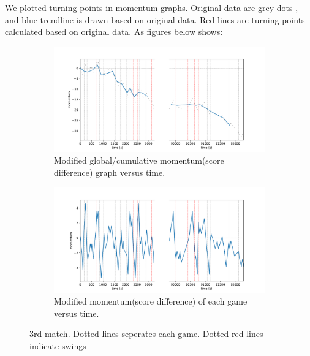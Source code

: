 \documentclass[UTF8]{mcmthesis}
\begin{document}
		We plotted turning points in momentum graphs. Original data are \color{gray} grey dots \color{black}, and \color{blue}blue trendline \color{black}is drawn based on original data. \color{red} Red lines \color{black} are turning points calculated based on original data. As figures below shows:
	
	\begin{figure}[H]
		\centering
		
		\begin{subfigure}[b]{\textwidth}
			\includegraphics[width=1\linewidth]{figs/fig4_2.pdf}
			\caption{Modified global/cumulative momentum(score difference) graph versus time.}
			\label{fig:topfig4_2}
		\end{subfigure}
		
		\vspace{1cm}
		
		\begin{subfigure}[b]{1.0\textwidth}
			\includegraphics[width=1\linewidth]{figs/fig5_2.pdf}
			\caption{Modified momentum(score difference) of each game versus time.}
			\label{fig:bottomfig5_2}
		\end{subfigure}
		
		\caption{3rd match. Dotted lines seperates each game. Dotted red lines indicate swings}
		\label{fig:both_figures2}
	\end{figure}
	
\end{document}
